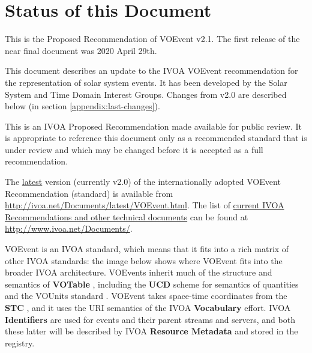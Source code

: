 \documentclass[11pt,a4paper]{ivoa}
\begin{document}
\section*{Status of this Document}
This is the Proposed Recommendation of VOEvent v2.1. The first release of the near final document was 2020 April 29th.

This document describes an update to the IVOA VOEvent recommendation for the representation of solar system events. It has been developed by the Solar System and Time Domain Interest Groups. Changes from v2.0 are described below (in section \ref{appendix:last-changes}). 

This is an IVOA Proposed Recommendation made available for public review. It is appropriate to reference this document only as a recommended standard that is under review and which may be changed before it is accepted as a full recommendation.

The \href{http://ivoa.net/Documents/latest/VOEvent.html}{latest} version (currently v2.0) of the internationally adopted VOEvent Recommendation (standard) is available from \url{http://ivoa.net/Documents/latest/VOEvent.html}. The list of \href{http://www.ivoa.net/Documents/}{current IVOA Recommendations and other technical documents} can be found at \url{http://www.ivoa.net/Documents/}.

VOEvent is an IVOA standard, which means that it fits into a rich matrix of other IVOA standards: the image below shows where VOEvent fits into the broader IVOA architecture. VOEvents inherit much of the structure and semantics of {\bf VOTable} \citep{2019ivoa.spec.1021O}, including the {\bf UCD} \citep{2018ivoa.spec.0527M} scheme for semantics of quantities and the VOUnits standard \citep{2014ivoa.spec.0523D}. VOEvent takes space-time coordinates from the {\bf STC} \citep{2007ivoa.spec.1030R}, and it uses the URI semantics of the IVOA {\bf Vocabulary} \citep{2009ivoa.spec.1007G} effort. IVOA {\bf Identifiers} \citep{2016ivoa.spec.0523D} are used for events and their parent streams and servers, and both these latter will be described by IVOA {\bf Resource Metadata} \citep{2007ivoa.spec.0302H} and stored in the registry. 
\end{document}
